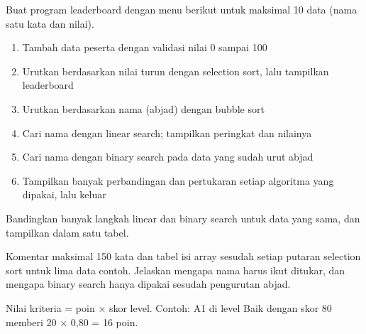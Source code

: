 \documentclass[a4paper]{article}
\begin{document}
Buat program leaderboard dengan menu berikut untuk maksimal 10 data (nama satu kata dan nilai).
\begin{enumerate}
\item Tambah data peserta dengan validasi nilai 0 sampai 100
\item Urutkan berdasarkan nilai turun dengan selection sort, lalu tampilkan leaderboard
\item Urutkan berdasarkan nama (abjad) dengan bubble sort
\item Cari nama dengan linear search; tampilkan peringkat dan nilainya
\item Cari nama dengan binary search pada data yang sudah urut abjad
\item Tampilkan banyak perbandingan dan pertukaran setiap algoritma yang dipakai, lalu keluar
\end{enumerate}
\begin{Contoh}
Bandingkan banyak langkah linear dan binary search untuk data yang sama, dan tampilkan dalam satu tabel.
\end{Contoh}
Komentar maksimal 150 kata dan tabel isi array sesudah setiap putaran selection sort untuk lima data contoh. Jelaskan mengapa nama harus ikut ditukar, dan mengapa binary search hanya dipakai sesudah pengurutan abjad.

\par\vspace{4pt}\par\vspace{6pt}
Nilai kriteria = poin × skor level. Contoh: A1 di level Baik dengan skor 80 memberi 20 × 0,80 = 16 poin.
\end{document}
